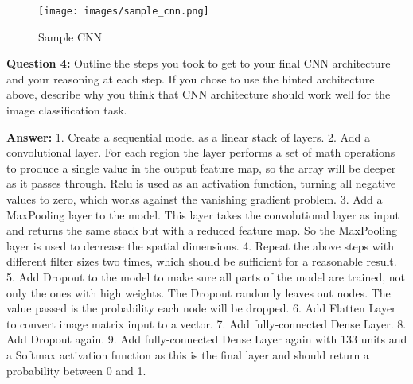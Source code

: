 \documentclass[11pt]{article}
\makeatletter
\def\maxwidth{\ifdim\Gin@nat@width>\linewidth\linewidth
    \else\Gin@nat@width\fi}
\let\Oldincludegraphics\includegraphics
\renewcommand{\includegraphics}[1]{\Oldincludegraphics[width=.8\maxwidth]{#1}}
\makeatother
\begin{document}
\begin{figure}
\centering
\texttt{[image: images/sample\_cnn.png]}
\caption{Sample CNN}
\end{figure}

\textbf{Question 4:} Outline the steps you took to get to your final CNN
architecture and your reasoning at each step. If you chose to use the
hinted architecture above, describe why you think that CNN architecture
should work well for the image classification task.

\textbf{Answer:} 1. Create a sequential model as a linear stack of
layers. 2. Add a convolutional layer. For each region the layer performs
a set of math operations to produce a single value in the output feature
map, so the array will be deeper as it passes through. Relu is used as
an activation function, turning all negative values to zero, which works
against the vanishing gradient problem. 3. Add a MaxPooling layer to the
model. This layer takes the convolutional layer as input and returns the
same stack but with a reduced feature map. So the MaxPooling layer is
used to decrease the spatial dimensions. 4. Repeat the above steps with
different filter sizes two times, which should be sufficient for a
reasonable result. 5. Add Dropout to the model to make sure all parts of
the model are trained, not only the ones with high weights. The Dropout
randomly leaves out nodes. The value passed is the probability each node
will be dropped. 6. Add Flatten Layer to convert image matrix input to a
vector. 7. Add fully-connected Dense Layer. 8. Add Dropout again. 9. Add
fully-connected Dense Layer again with 133 units and a Softmax
activation function as this is the final layer and should return a
probability between 0 and 1.
\end{document}
